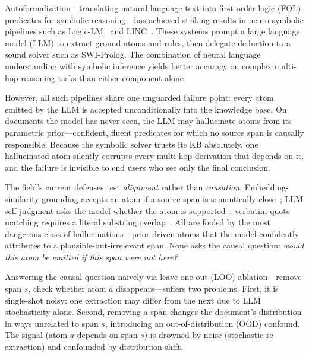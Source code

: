 \documentclass[11pt,letterpaper]{article}
\begin{document}
Autoformalization---translating natural-language text into first-order logic (FOL) predicates for symbolic
reasoning---has achieved striking results in neuro-symbolic pipelines such as Logic-LM~\citep{Pan2023} and
LINC~\citep{Olausson2023}. These systems prompt a large language model (LLM) to extract ground atoms and rules, then
delegate deduction to a sound solver such as SWI-Prolog. The combination of neural language understanding with symbolic
inference yields better accuracy on complex multi-hop reasoning tasks than either component alone.

However, all such pipelines share one unguarded failure point: every atom emitted by the LLM is accepted
unconditionally into the knowledge base. On documents the model has never seen, the LLM may hallucinate atoms from its
parametric prior---confident, fluent predicates for which no source span is causally responsible. Because the symbolic
solver trusts its KB absolutely, one hallucinated atom silently corrupts every multi-hop derivation that depends on it,
and the failure is invisible to end users who see only the final conclusion.

The field's current defenses test \emph{alignment} rather than \emph{causation}. Embedding-similarity grounding
accepts an atom if a source span is semantically close~\citep{Khorshidi2025}; LLM self-judgment asks the model whether
the atom is supported~\citep{Pan2023}; verbatim-quote matching requires a literal substring
overlap~\citep{Khorshidi2025}. All are fooled by the most dangerous class of hallucinations---prior-driven atoms that
the model confidently attributes to a plausible-but-irrelevant span. None asks the causal question: \emph{would this
atom be emitted if this span were not here?}

Answering the causal question naively via leave-one-out (LOO) ablation---remove span $s$, check whether atom $a$
disappears---suffers two problems. First, it is single-shot noisy: one extraction may differ from the next due to LLM
stochasticity alone. Second, removing a span changes the document's distribution in ways unrelated to span $s$,
introducing an out-of-distribution (OOD) confound. The signal (atom $a$ depends on span $s$) is drowned by noise
(stochastic re-extraction) and confounded by distribution shift.
\end{document}
